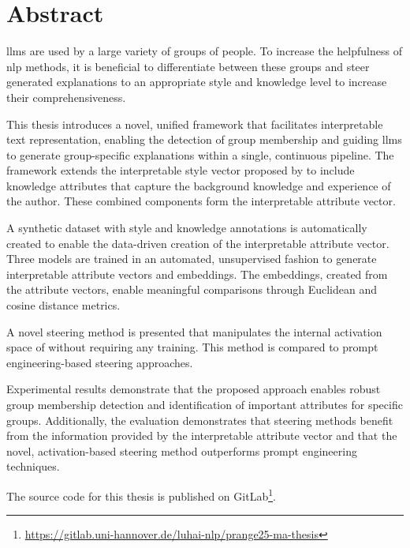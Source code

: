 %
\chapter*{Abstract}%
\label{sec:abstract}
\vspace*{-10mm}

\Acp{llm} are used by a large variety of groups of people. To increase the helpfulness of \ac{nlp} methods, it is beneficial to differentiate between these groups and steer generated explanations to an appropriate style and knowledge level to increase their comprehensiveness.

This thesis introduces a novel, unified framework that facilitates interpretable text representation, enabling the detection of group membership and guiding \acp{llm} to generate group-specific explanations within a single, continuous pipeline. The framework extends the interpretable style vector proposed by \citet{patelLearningInterpretableStyle2023} to include knowledge attributes that capture the background knowledge and experience of the author. These combined components form the interpretable attribute vector.

A synthetic dataset with style and knowledge annotations is automatically created to enable the data-driven creation of the interpretable attribute vector. Three models are trained in an automated, unsupervised fashion to generate interpretable attribute vectors and embeddings. The embeddings, created from the attribute vectors, enable meaningful comparisons through Euclidean and cosine distance metrics.

A novel steering method is presented that manipulates the internal activation space of  without requiring any training. This method is compared to prompt engineering-based steering approaches.

Experimental results demonstrate that the proposed approach enables robust group membership detection and identification of important attributes for specific groups. Additionally, the evaluation demonstrates that steering methods benefit from the information provided by the interpretable attribute vector and that the novel, activation-based steering method outperforms prompt engineering techniques.

The source code for this thesis is published on GitLab\footnote{\url{https://gitlab.uni-hannover.de/luhai-nlp/prange25-ma-thesis}}.



